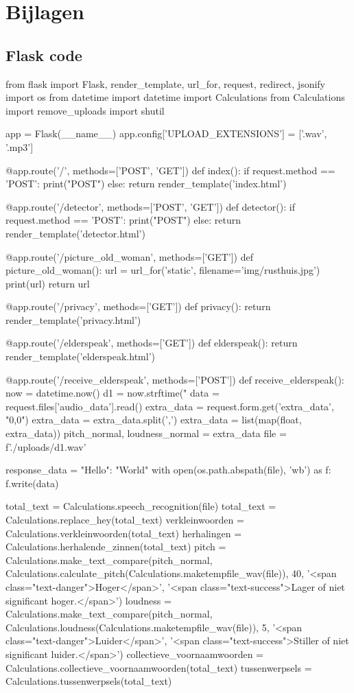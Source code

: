 \chapter{Bijlagen}
\label{ch:bijlagen}

\section{Flask code}

\begin{python}
from flask import Flask, render_template, url_for, request, redirect, jsonify
import os
from datetime import datetime
import Calculations
from Calculations import remove_uploads
import shutil

app = Flask(__name__)
app.config['UPLOAD_EXTENSIONS'] = ['.wav', '.mp3']


@app.route('/', methods=['POST', 'GET'])
def index():
   if request.method == 'POST':
        print("POST")
   else:
        return render_template('index.html')


@app.route('/detector', methods=['POST', 'GET'])
def detector():
   if request.method == 'POST':
        print("POST")
   else:
        return render_template('detector.html')


@app.route('/picture_old_woman', methods=['GET'])
def picture_old_woman():
   url = url_for('static', filename='img/rusthuis.jpg')
   print(url)
   return url


@app.route('/privacy', methods=['GET'])
def privacy():
    return render_template('privacy.html')


@app.route('/elderspeak', methods=['GET'])
def elderspeak():
    return render_template('elderspeak.html')


@app.route('/receive_elderspeak', methods=['POST'])
def receive_elderspeak():
   now = datetime.now()
   d1 = now.strftime("%
   data = request.files['audio_data'].read()
   extra_data = request.form.get('extra_data', "0,0")
   extra_data = extra_data.split(',')
   extra_data = list(map(float, extra_data))
   pitch_normal, loudness_normal = extra_data
   file = f'./uploads/{d1}.wav'

   response_data = {"Hello": "World"}
   with open(os.path.abspath(file), 'wb') as f:
   f.write(data)

   total_text = Calculations.speech_recognition(file)
   total_text = Calculations.replace_hey(total_text)
   verkleinwoorden = Calculations.verkleinwoorden(total_text)
   herhalingen = Calculations.herhalende_zinnen(total_text)
   pitch = Calculations.make_text_compare(pitch_normal,
   Calculations.calculate_pitch(Calculations.maketempfile_wav(file)),
        40,
       '<span class="text-danger">Hoger</span>',
       '<span class="text-success">Lager of niet significant hoger.</span>')
   loudness = Calculations.make_text_compare(pitch_normal,
       Calculations.loudness(Calculations.maketempfile_wav(file)),
       5,
       '<span class="text-danger">Luider</span>',
       '<span class="text-success">Stiller of niet significant luider.</span>')
   collectieve_voornaamwoorden = Calculations.collectieve_voornaamwoorden(total_text)
   tussenwerpsels = Calculations.tussenwerpsels(total_text)


\end{python}
